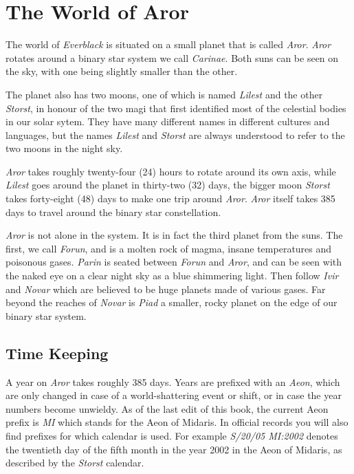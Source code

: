 \twocolumn
\section{The World of Aror}
\label{sec:Aror}

The world of \emph{Everblack} is situated on a small planet that is
called \emph{Aror}. \emph{Aror} rotates around a binary star system we
call \emph{Carinae}. Both suns can be seen on the sky, with one being
slightly smaller than the other.

The planet also has two moons, one of which is named \emph{Lilest} and
the other \emph{Storst}, in honour of the two magi that first
identified most of the celestial bodies in our solar sytem. They have
many different names in different cultures and languages, but the
names \emph{Lilest} and \emph{Storst} are always understood to refer
to the two moons in the night sky.

\emph{Aror} takes roughly twenty-four (24) hours to rotate around its
own axis, while \emph{Lilest} goes around the planet in thirty-two
(32) days, the bigger moon \emph{Storst} takes forty-eight (48) days
to make one trip around \emph{Aror}. \emph{Aror} itself takes 385 days
to travel around the binary star constellation.

\emph{Aror} is not alone in the system. It is in fact the third planet
from the suns. The first, we call \emph{Forun}, and is a molten rock
of magma, insane temperatures and poisonous gases. \emph{Parin} is
seated between \emph{Forun} and \emph{Aror}, and can be seen with the
naked eye on a clear night sky as a blue shimmering light. Then follow
\emph{Ivir} and \emph{Novar} which are believed to be huge planets made
of various gases. Far beyond the reaches of \emph{Novar} is
\emph{Piad} a smaller, rocky planet on the edge of our binary star
system.

\subsection{Time Keeping}

A year on \emph{Aror} takes roughly 385 days. Years are prefixed with an
\emph{Aeon}, which are only changed in case of a world-shattering event
or shift, or in case the year numbers become unwieldy. As of the last
edit of this book, the current Aeon prefix is \emph{MI} which stands for
the Aeon of Midaris. In official records you will also find prefixes for
which calendar is used. For example \emph{S/20/05 MI:2002} denotes the
twentieth day of the fifth month in the year 2002 in the Aeon of
Midaris, as described by the \emph{Storst} calendar.

